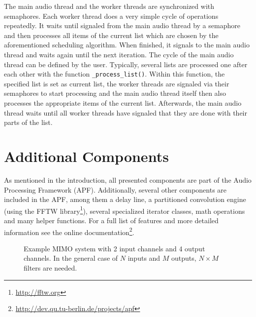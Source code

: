 \documentclass[11pt,letterpaper]{article}
\newcommand{\code}{\texttt}
\newcommand{\distance}{1.2em}
\begin{document}
The main audio thread and the worker threads are synchronized with semaphores.
Each worker thread does a very simple cycle of operations repeatedly. It waits
until signaled from the main audio thread by a semaphore and then processes all items
of the current list which are chosen by the aforementioned scheduling
algorithm. When finished, it signals to the main audio thread and waits again
until the next iteration.
The cycle of the main audio thread can be defined by the user. Typically,
several lists are processed one after each other with the function
\code{\string_process\string_list()}.
Within this function, the specified list is set as current list, the worker
threads are signaled via their semaphores to start processing and the main audio
thread itself then also processes
the appropriate items of the current list.
Afterwards, the main audio thread waits until all worker threads have signaled
that they are done with their parts of the list.

\section{Additional Components}

As mentioned in the introduction, all presented components are part of the
Audio Processing Framework (APF).
Additionally, several other components are included in the APF, among them a 
delay line, a partitioned convolution engine (using the FFTW
library\footnote{\url{http://fftw.org}}), several specialized iterator classes,
math operations and many helper functions.
For a full list of features and more detailed information see the online
documentation\footnote{\url{http://dev.qu.tu-berlin.de/projects/apf}}.

\begin{figure}
\def\fork#1{
\path[fork] node[point] (fork#1) {}
[sibling distance=4.5ex,every child node/.style=box]
child foreach \number in {1,...,4} {node (h-#1-\number) {$h_{#1,\number}(t)$}}
node [left=of fork#1,nobox] (input#1) {input #1} edge[noarrow] (fork#1);
}

\def\shift{-19ex}

\begin{center}
\end{center}
\caption{Example MIMO system with 2 input channels and 4 output channels. In the
general case of $N$ inputs and $M$ outputs, $N\!\times\!M$ filters are needed.}
\label{fig:example1}
\end{figure}
\end{document}

